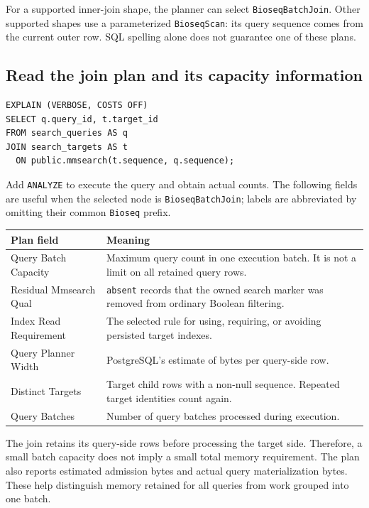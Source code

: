 For a supported inner-join shape, the planner can select
\texttt{BioseqBatchJoin}. Other supported shapes use a parameterized
\texttt{BioseqScan}: its query sequence comes from the current outer row.
SQL spelling alone does not guarantee one of these plans.

\subsection{Read the join plan and its capacity information}

\par\noindent\begin{minipage}{\linewidth}
\begin{lstlisting}[style=bioseq-appendix-sql]
EXPLAIN (VERBOSE, COSTS OFF)
SELECT q.query_id, t.target_id
FROM search_queries AS q
JOIN search_targets AS t
  ON public.mmsearch(t.sequence, q.sequence);
\end{lstlisting}
\end{minipage}

Add \texttt{ANALYZE} to execute the query and obtain actual counts. The
following fields are useful when the selected node is
\texttt{BioseqBatchJoin}; labels are abbreviated by omitting their common
\texttt{Bioseq} prefix.

\begin{center}
\small
\begin{tabular}{@{}p{.35\linewidth}p{.60\linewidth}@{}}
\toprule
Plan field & Meaning \\
\midrule
Query Batch Capacity & Maximum query count in one execution batch. It is
  not a limit on all retained query rows. \\
Residual Mmsearch Qual & \texttt{absent} records that the owned search
  marker was removed from ordinary Boolean filtering. \\
Index Read Requirement & The selected rule for using, requiring, or
  avoiding persisted target indexes. \\
Query Planner Width & PostgreSQL's estimate of bytes per query-side row. \\
Distinct Targets & Target child rows with a non-null sequence. Repeated
  target identities count again. \\
Query Batches & Number of query batches processed during execution. \\
\bottomrule
\end{tabular}
\end{center}

The join retains its query-side rows before processing the target side.
Therefore, a small batch capacity does not imply a small total memory
requirement. The plan also reports estimated admission bytes and actual
query materialization bytes. These help distinguish memory retained for
all queries from work grouped into one batch.

